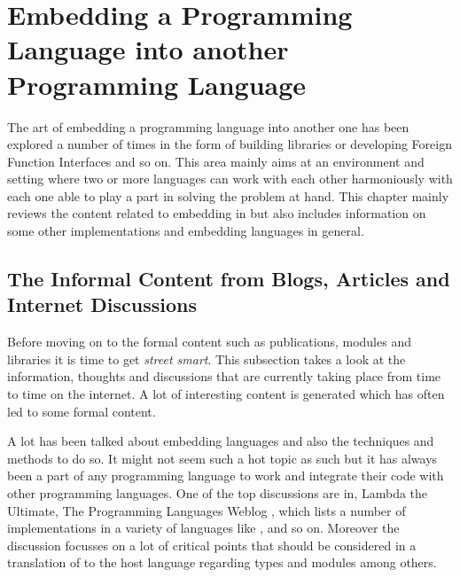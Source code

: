 \documentclass[thesis-solanki.tex]{subfiles}
\begin{document}
\chapter{Embedding a Programming Language into another Programming Language }\label{chap:embedding}

The art of embedding a programming language into another one has been explored a number of times in the form 
of building libraries or developing Foreign Function Interfaces and so on. This area mainly aims at an environment 
and setting where two or more languages can work with each other harmoniously with each one able to play a part 
in solving the problem at hand. This chapter mainly reviews the content related to embedding  in 
 but also includes information on some other implementations and embedding languages in 
general.          

\section{The Informal Content from Blogs, Articles and Internet Discussions}

Before moving on to the formal content such as publications, modules and libraries it is time to get \textit{street 
smart}. This subsection takes a look at the information, thoughts and discussions that are currently taking place 
from time to time on the internet. A lot of interesting content is generated which has often led to some formal 
content.   

\par A lot has been talked about embedding languages and also the techniques and methods to do so. It might not 
seem such a hot topic as such but it has always been a part of any programming language to work and integrate 
their code with other programming languages. One of the top discussions are in, Lambda the Ultimate, The 
Programming Languages Weblog \cite{website:lambda-the-ultimate},  which lists a number of  
implementations in a variety of languages like , 
 \cite{racklog} and so on. Moreover the discussion focusses on a lot of critical points that should 
be considered in a translation of  to the host language regarding types and modules among 
others. 
\end{document}
